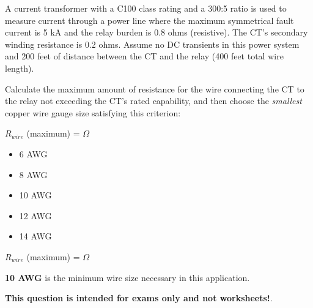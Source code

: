 

A current transformer with a C100 class rating and a 300:5 ratio is used to measure current through a power line where the maximum symmetrical fault current is 5 kA and the relay burden is 0.8 ohms (resistive).  The CT's secondary winding resistance is 0.2 ohms.  Assume no DC transients in this power system and 200 feet of distance between the CT and the relay (400 feet total wire length).

\vskip 10pt

Calculate the maximum amount of resistance for the wire connecting the CT to the relay not exceeding the CT's rated capability, and then choose the {\it smallest} copper wire gauge size satisfying this criterion:

\vskip 10pt

$R_{wire}$ (maximum) = \underbar{\hskip 50pt} $\Omega$

\vskip 10pt

\begin{itemize}
\item{} 6 AWG
\item{} 8 AWG
\item{} 10 AWG
\item{} 12 AWG
\item{} 14 AWG
\end{itemize}







$R_{wire}$ (maximum) =  $\Omega$

\vskip 10pt

{\bf 10 AWG} is the minimum wire size necessary in this application.







{\bf This question is intended for exams only and not worksheets!}.



